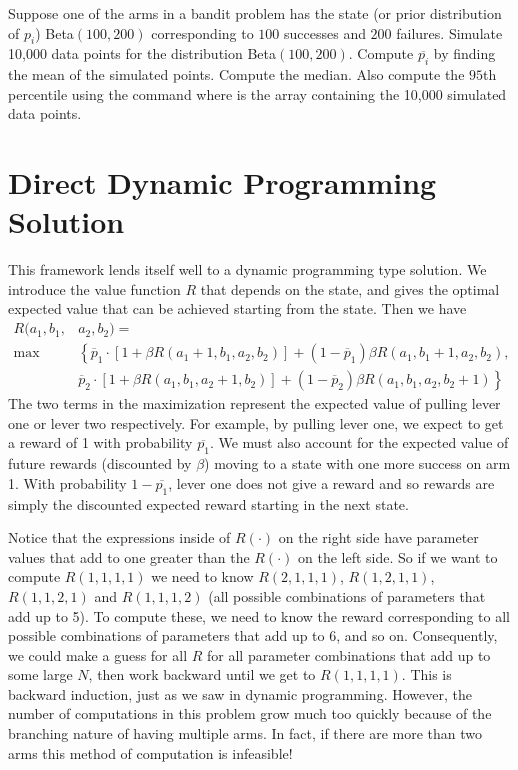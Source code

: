 \begin{problem}
Suppose one of the arms in a bandit problem has the state (or prior distribution of $p_i$)
Beta$(100,200)$ corresponding to $100$ successes and $200$ failures.
Simulate 10,000 data points for the distribution Beta$(100,200)$.
Compute $\overline{p_i}$ by finding the mean of the simulated points.
Compute the median.  Also compute the $95$th percentile using the command
 where  is the array
containing the 10,000 simulated data points.
\end{problem}

\section*{Direct Dynamic Programming Solution}
This framework lends itself well to a dynamic programming type solution.
We introduce the value function $R$ that depends on the state, and gives
the optimal expected value that can be achieved
starting from the state.  Then we have
\begin{equation}
\label{recurs}
\begin{aligned}
R(a_1,b_1,&a_2,b_2) =\\
 \max&\left\{\overline{p}_1\cdot[1 + \beta R(a_1+1,b_1,a_2,b_2)] + 
 (1-\overline{p}_1)\beta R(a_1,b_1+1,a_2,b_2)\right. ,\\
&  \left.\overline{p}_2\cdot[1 + \beta R(a_1,b_1,a_2+1,b_2)] + 
(1-\overline{p}_2)\beta R(a_1,b_1,a_2,b_2+1)\right\}
\end{aligned}
\end{equation}
The two terms in the maximization represent the expected value of pulling lever
one or lever two respectively.  For example, by pulling lever one, we expect
to get a reward of 1 with probability $\overline{p_1}$.
We must also account for the expected value of future rewards
(discounted by $\beta$) moving to a state with one more success on arm 1.
With probability $1-\overline{p_1}$, lever one does not give a reward and so
rewards are simply the discounted expected reward starting in the next state.

Notice that the expressions inside of $R(\cdot)$ on the right side have parameter
values that add to one greater than the $R(\cdot)$ on the left side.
So if we want to compute $R(1,1,1,1)$ we need to know
$R(2,1,1,1)$, $R(1,2,1,1)$, $R(1,1,2,1)$ and $R(1,1,1,2)$
(all possible combinations of parameters that add up to 5).
To compute these, we need to know the reward corresponding to all possible
combinations of parameters that add up to 6, and so on.  Consequently, we could
make a guess for all $R$ for all parameter combinations that add up to some large $N$,
then work backward until we get to $R(1,1,1,1)$.  This is backward induction,
just as we saw in dynamic programming.  However, the number of computations in this
problem grow much too quickly because of the branching nature of having multiple arms.
In fact, if there are more than two arms this method of computation is infeasible!


